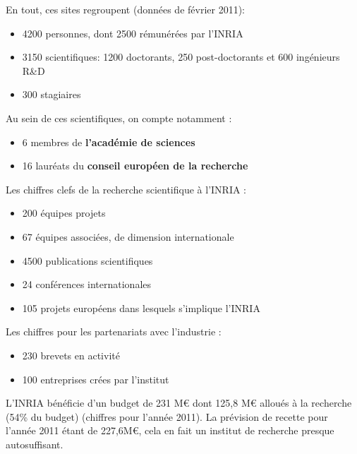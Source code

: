 \documentclass[a4paper, 11pt]{report}
\begin{document}
    En tout, ces sites regroupent (données de février 2011):
    \begin{itemize}
      \item 4200 personnes, dont 2500 rémunérées par l'INRIA
      \item 3150 scientifiques: 1200 doctorants, 250 post-doctorants et 600
        ingénieurs R\&D
      \item 300 stagiaires \\
    \end{itemize}
    Au sein de ces scientifiques, on compte notamment :
    \begin{itemize}
      \item 6 membres de \textbf{l'académie de sciences}
      \item 16 lauréats du \textbf{conseil européen de la recherche} \\
    \end{itemize}

    Les chiffres clefs de la recherche scientifique à l'INRIA :
    \begin{itemize}
      \item 200 équipes projets
      \item 67 équipes associées, de dimension internationale
      \item 4500 publications scientifiques
      \item 24 conférences internationales
      \item 105 projets européens dans lesquels s'implique l'INRIA \\
    \end{itemize}

    Les chiffres pour les partenariats avec l'industrie :
    \begin{itemize}
      \item 230 brevets en activité
      \item 100 entreprises crées par l'institut \\
    \end{itemize}

    L'INRIA bénéficie d'un budget de 231 M\euro{} dont 125,8 M\euro{} alloués à la
    recherche (54\% du budget) (chiffres pour l'année 2011). La prévision
    de recette pour l'année 2011 étant de 227,6M\euro{}, cela en fait un institut
    de recherche presque autosuffisant.
\end{document}
